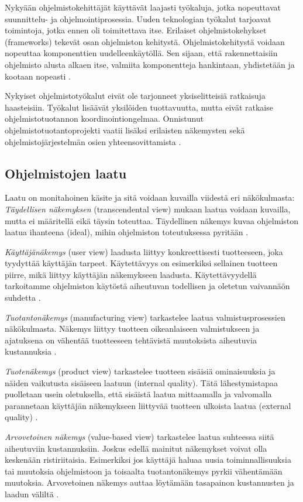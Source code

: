 \documentclass[finnish]{tktltiki2}
\theoremstyle{definition}
\theoremstyle{remark}
\begin{document}
Nykyään ohjelmistokehittäjät käyttävät laajasti työkaluja, jotka nopeuttavat suunnittelu- ja ohjelmointiprosessia. Uuden teknologian työkalut tarjoavat toimintoja, jotka ennen oli toimitettava itse. Erilaiset ohjelmistokehykset (frameworks) tekevät osan ohjelmiston kehitystä. Ohjelmistokehitystä voidaan nopeuttaa komponenttien uudelleen\-käytöllä. Sen sijaan, että rakennettaisiin ohjelmisto alusta alkaen itse, valmiita komponentteja hankintaan, yhdistetään ja kootaan nopeasti \cite{BRL03}.

Nykyiset ohjelmistotyökalut eivät ole tarjonneet yksiselitteisiä ratkaisuja haasteisiin. Työkalut lisäävät yksilöiden tuottavuutta, mutta eivät ratkaise ohjelmistotuotannon koordinointiongelmaa. Onnistunut ohjelmistotuotantoprojekti vaatii lisäksi erilaisten näkemysten sekä ohjelmistojärjestelmän osien yhteensovittamista \cite{KES95}.

\subsection{Ohjelmistojen laatu}

Laatu on monitahoinen käsite ja sitä voidaan kuvailla viidestä eri näkökulmasta: \textit{Täydellisen näkemyksen} (transcendental view) mukaan laatua voidaan kuvailla, mutta ei määritellä eikä täysin toteuttaa. Täydellinen näkemys kuvaa ohjelmiston laatua ihanteena (ideal), mihin ohjelmiston toteutuksessa pyritään \cite{KIP96}. 

\textit{ Käyttäjänäkemys} (user view) laadusta liittyy konkreettisesti tuotteeseen, joka tyydyttää käyttäjän tarpeet. Käytettävyys on esimerkiksi sellainen tuotteen piirre, mikä liittyy käyttäjän näkemykseen laadusta. Käytettävyydellä tarkoitamme ohjelmiston käytöstä aiheutuvan todellisen ja oletetun vaivannäön suhdetta \cite{KIP96}.  

\textit{Tuotantonäkemys} (manufacturing view) tarkastelee laatua valmistusprosessien näkökulmasta. Näkemys liittyy tuotteen oikeanlaiseen valmistukseen ja ajatuksena on vähentää tuotteeseen tehtävistä muutoksista aiheutuvia kustannuksia \cite{KIP96}. 

 \textit {Tuotenäkemys} (product view) tarkastelee tuotteen sisäisiä ominaisuuksia ja näiden vaikutusta sisäiseen laatuun (internal quality). Tätä lähestymistapaa puolletaan usein oletuksella, että sisäistä laatua mittaamalla ja valvomalla parannetaan käyttäjän näkemykseen liittyvää tuotteen ulkoista laatua (external quality) \cite{KIP96}.  

 \textit{Arvovetoinen näkemys} (value-based view) tarkastelee laatua suhteessa siitä aiheutuviin kustannuksiin. Joskus edellä mainitut näkemykset voivat olla keskenään ristiriitaisia. Esimerkiksi jos käyttäjä haluaa uusia toiminnallisuuksia tai muutoksia ohjelmistoon ja toisaalta tuotantonäkemys pyrkii vähentämään muutoksia. Arvovetoinen näkemys auttaa löytämään tasapainon kustannusten ja laadun väliltä \cite{KIP96}.
\end{document}
